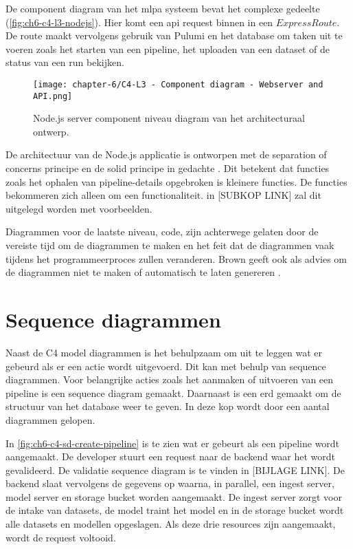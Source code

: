 De component diagram van het \acrshort{mlpa} systeem bevat het complexe gedeelte (\autoref{fig:ch6-c4-l3-nodejs}). Hier komt een \acrshort{api} request binnen in een \(Express Route\). De route maakt vervolgens gebruik van Pulumi en het database om taken uit te voeren zoals het starten van een pipeline, het uploaden van een dataset of de status van een run bekijken.

\begin{figure}[hbt!]
  \centering
  \texttt{[image: chapter-6/C4-L3 - Component diagram - Webserver and API.png]}
  \caption{Node.js server component niveau diagram van het architecturaal ontwerp.}
  \label{fig:ch6-c4-l3-nodejs}
\end{figure}

De architectuur van de Node.js applicatie is ontworpen met de separation of concerns principe en de \acrfull{solid} principe in gedachte \cite{dijkstra-separation-of-concerns} \cite{solid-principle}. Dit betekent dat functies zoals het ophalen van pipeline-details opgebroken is kleinere functies. De functies bekommeren zich alleen om een functionaliteit. in [SUBKOP LINK] zal dit uitgelegd worden met voorbeelden.

Diagrammen voor de laatste niveau, code, zijn achterwege gelaten door de vereiste tijd om de diagrammen te maken en het feit dat de diagrammen vaak tijdens het programmeerproces zullen veranderen. Brown geeft ook als advies om de diagrammen niet te maken of automatisch te laten genereren \cite{c4-model-faq}.

\newpage

\section{Sequence diagrammen}\label{sec:ch6-sequence-diagrammen}
Naast de C4 model diagrammen is het behulpzaam om uit te leggen wat er gebeurd als er een actie wordt uitgevoerd. Dit kan met behulp van sequence diagrammen. Voor belangrijke acties zoals het aanmaken of uitvoeren van een pipeline is een sequence diagram gemaakt. Daarnaast is een \acrfull{erd} gemaakt om de structuur van het database weer te geven. In deze kop wordt door een aantal diagrammen gelopen.

In \autoref{fig:ch6-c4-sd-create-pipeline} is te zien wat er gebeurt als een pipeline wordt aangemaakt. De developer stuurt een request naar de backend waar het wordt gevalideerd. De validatie sequence diagram is te vinden in [BIJLAGE LINK]. De backend slaat vervolgens de gegevens op waarna, in parallel, een ingest server, model server en storage bucket worden aangemaakt. De ingest server zorgt voor de intake van datasets, de model traint het model en in de storage bucket wordt alle datasets en modellen opgeslagen. Als deze drie resources zijn aangemaakt, wordt de request voltooid.

